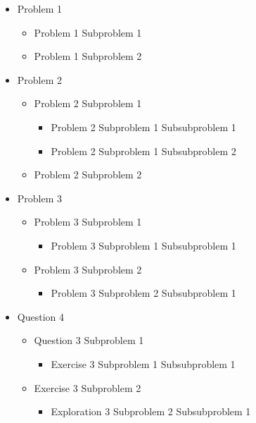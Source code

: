 \documentclass{ximera}
\begin{document}
\begin{itemize}
    \item Problem 1
    \begin{itemize}
        \item Problem 1 Subproblem 1
        \item Problem 1 Subproblem 2
    \end{itemize}
    \item Problem 2
    \begin{itemize}
        \item Problem 2 Subproblem 1
        \begin{itemize}
            \item Problem 2 Subproblem 1 Subsubproblem 1
            \item Problem 2 Subproblem 1 Subsubproblem 2
        \end{itemize}
        \item Problem 2 Subproblem 2
    \end{itemize}
    \item Problem 3
    \begin{itemize}
        \item Problem 3 Subproblem 1
        \begin{itemize}
            \item Problem 3 Subproblem 1 Subsubproblem 1
        \end{itemize}
        \item Problem 3 Subproblem 2
        \begin{itemize}
            \item Problem 3 Subproblem 2 Subsubproblem 1
        \end{itemize}
    \end{itemize}
    \item Question 4
    \begin{itemize}
        \item Question 3 Subproblem 1
        \begin{itemize}
            \item Exercise 3 Subproblem 1 Subsubproblem 1
        \end{itemize}
        \item Exercise 3 Subproblem 2
        \begin{itemize}
            \item Exploration 3 Subproblem 2 Subsubproblem 1
        \end{itemize}
    \end{itemize}
\end{itemize}
\end{document}
